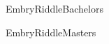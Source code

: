 

\newcommand{\educationEntry}[6]{
  \keepTogether{
    \doubleLineEntry{#1 | #2}{GPA: #3}{Graduation: #4}{#5}
    #6
  }
}

\newcommand{\Education}{
  \customSection{Education}
  
  \EmbryRiddleMasters
  
  \EmbryRiddleBachelor
}

{EmbryRiddleBachelors}

{EmbryRiddleMasters}

